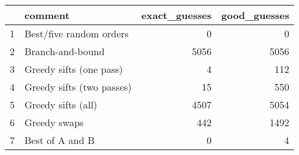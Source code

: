 \begin{table}[ht]
\centering
\begin{tabular}{rlrr}
  \hline
 & comment & exact\_guesses & good\_guesses \\ 
  \hline
1 & Best/five random orders &   0 &   0 \\ 
  2 & Branch-and-bound & 5056 & 5056 \\ 
  3 & Greedy sifts (one pass) &   4 & 112 \\ 
  4 & Greedy sifts (two passes) &  15 & 550 \\ 
  5 & Greedy sifts (all) & 4507 & 5054 \\ 
  6 & Greedy swaps & 442 & 1492 \\ 
  7 & Best of A and B &   0 &   4 \\ 
   \hline
\end{tabular}
\end{table}
